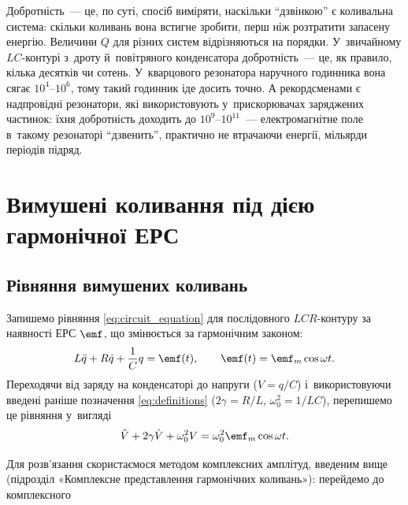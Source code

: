 Добротність~--- це, по суті, спосіб виміряти, наскільки \enquote{дзвінкою} є коливальна система: скільки коливань вона встигне зробити, перш ніж розтратити запасену енергію. Величини $Q$ для різних систем відрізняються на порядки. У~звичайному $LC$-контурі з~дроту й~повітряного конденсатора добротність~--- це, як правило, кілька десятків чи сотень. У~кварцового резонатора наручного годинника вона сягає $10^{4}$--$10^{6}$, тому такий годинник іде досить точно. А рекордсменами є надпровідні резонатори, які використовують у~прискорювачах заряджених частинок: їхня добротність доходить до $10^{9}$--$10^{11}$~--- електромагнітне поле в~такому резонаторі \enquote{дзвенить}, практично не втрачаючи енергії, мільярди періодів підряд.

\section{Вимушені коливання під дією гармонічної ЕРС}\label{sec:forced}\hypertarget{forced-oscillations}{}

\subsection*{Рівняння вимушених коливань}

Запишемо рівняння \eqref{eq:circuit_equation} для послідовного $LCR$-контуру за наявності ЕРС $\emf$,
що змінюється за гармонічним законом:
\begin{equation}\label{eq:forced_equation}
	L\ddot{q} + R\dot{q} + \frac{1}{C}q = \emf(t), \qquad
	\emf(t) = \emf_m \cos\omega t.
\end{equation}
Переходячи від заряду на конденсаторі до напруги ($V = q/C$) і~використовуючи введені раніше позначення \eqref{eq:definitions} ($2\gamma = R/L$, $\omega_0^2 = 1/LC$), перепишемо це рівняння у~вигляді
\begin{equation}\label{eq:forced_equation_V}
	\ddot{V} + 2\gamma\dot{V} + \omega_0^2 V = \omega_0^2 \emf_m \cos\omega t.
\end{equation}

Для розв'язання скористаємося методом комплексних амплітуд, введеним вище (підрозділ «Комплексне представлення гармонічних коливань»): перейдемо до комплексного

